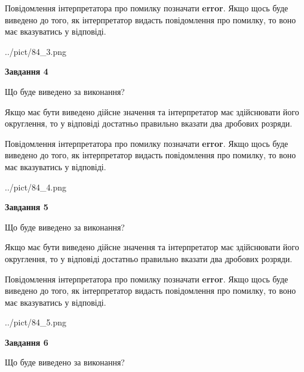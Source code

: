\documentclass[12pt, ukrainian]{article}
\begin{document}
{\begin {Large}
Повідомлення інтерпретатора про помилку позначати \textbf{error}.
Якщо щось буде виведено до того, як інтерпретатор видасть повідомлення про помилку, 
то воно має вказуватись у відповіді. \par

\begin{center}
	{../pict/84_3.png}
\end{center}
\newpage

{\begin {center}\textbf{Завдання 4}\end {center}}\par
Що буде виведено за виконання? \par

Якщо має бути виведено дійсне значення та інтерпретатор має здійснювати його округлення, 
то у відповіді достатньо правильно вказати два дробових розряди.

Повідомлення інтерпретатора про помилку позначати \textbf{error}.
Якщо щось буде виведено до того, як інтерпретатор видасть повідомлення про помилку, 
то воно має вказуватись у відповіді. \par

\begin{center}
	{../pict/84_4.png}
\end{center}
\newpage

{\begin {center}\textbf{Завдання 5}\end {center}}\par
Що буде виведено за виконання? \par

Якщо має бути виведено дійсне значення та інтерпретатор має здійснювати його округлення, 
то у відповіді достатньо правильно вказати два дробових розряди.

Повідомлення інтерпретатора про помилку позначати \textbf{error}.
Якщо щось буде виведено до того, як інтерпретатор видасть повідомлення про помилку, 
то воно має вказуватись у відповіді. \par

\begin{center}
	{../pict/84_5.png}
\end{center}
\newpage

{\begin {center}\textbf{Завдання 6}\end {center}}\par
Що буде виведено за виконання? \par


\end{Large}}
\end{document}
